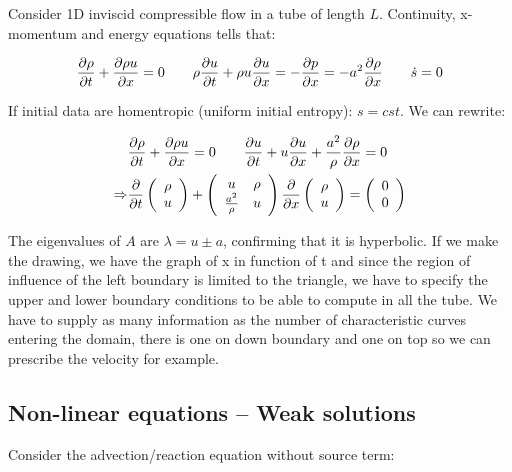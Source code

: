 Consider 1D inviscid compressible flow in a tube of length $L$. Continuity, x-momentum and energy equations tells that: 

\begin{equation}
\frac{\partial \rho}{\partial t} + \frac{\partial \rho u}{\partial x} = 0 \qquad \rho \frac{\partial u}{\partial t} + \rho u \frac{\partial u }{\partial x} = - \frac{\partial p}{\partial x}= -a^2\frac{\partial \rho}{\partial x} \qquad \dot{s} = 0
\end{equation}

If initial data are homentropic (uniform initial entropy): $s = cst$. We can rewrite: 

\begin{equation}
\begin{aligned}
&\frac{\partial \rho}{\partial t} + \frac{\partial \rho u}{\partial x} = 0 \qquad \frac{\partial u}{\partial t} + u \frac{\partial u }{\partial x} + \frac{a^2}{\rho} \frac{\partial \rho}{\partial x} = 0\\
\Rightarrow &\frac{\partial }{\partial t} \left( 
\begin{array}{c}
\rho \\
u
\end{array}
\right) + \left( 
\begin{array}{cc}
u & \rho\\
\frac{a^2}{\rho} & u
\end{array}
\right) 
\frac{\partial}{\partial x} \left( 
\begin{array}{c}
\rho \\
u
\end{array}
\right) 
=
\left( 
\begin{array}{c}
0 \\
0
\end{array}
\right) 
\end{aligned}
\end{equation}

The eigenvalues of $A$ are $\lambda = u\pm a$, confirming that it is hyperbolic. If we make the drawing, we have the graph of x in function of t and since the region of influence of the left boundary is limited to the triangle, we have to specify the upper and lower boundary conditions to be able to compute in all the tube. We have to supply as many information as the number of characteristic curves entering the domain, there is one on down boundary and one on top so we can prescribe the velocity for example. \\

\subsection{Non-linear equations – Weak solutions}
Consider the advection/reaction equation without source term: 

